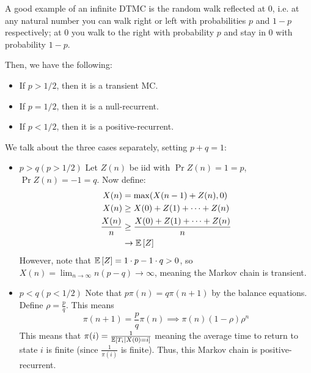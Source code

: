 A good example of an infinite DTMC is the random walk reflected at 0, i.e. at any natural number you can walk right or left with probabilities
$p$ and $1-p$ respectively; at 0 you walk
to the right with probability $p$ and stay in 0 with probability $1 - p$.

Then, we have the following:
\begin{itemize}
    \item If $p > 1/2$, then it is a transient MC.
    \item If $p = 1/2$, then it is a null-recurrent.
    \item If $p < 1/2$, then it is a positive-recurrent.
\end{itemize}

\begin{proof*}
    We talk about the three cases separately, setting $p + q = 1$:
    \begin{itemize}
        \item $p > q (p > 1/2)$
        Let $Z(n)$ be iid with $\Pr{Z(n) = 1} = p$, $\Pr{Z(n) = -1} = q$. Now define:
        \begin{align*} 
            X(n) &= \max(X(n - 1) + Z(n), 0) \\
            X(n) &\geq X(0) + Z(1) + \dots + Z(n) \\
            \frac{X(n)}{n} &\geq \frac{X(0) + Z(1) + \dots + Z(n)}{n} \\
            &\to \mathbb{E}\left[ Z \right]
        \end{align*}
        However, note that $\mathbb{E}\left[ Z \right] = 1 \cdot p - 1 \cdot q > 0 $, so $X(n) = \lim_{n \to \infty} n(p - q) \to \infty$, meaning
        the Markov chain is transient.
    \end{itemize}

    \begin{itemize}
        \item $p < q (p < 1/2)$
        Note that $p \pi(n) = q \pi(n + 1)$ by the balance equations. Define $\rho = \frac{p}{q}$. This means
        \[ \pi(n + 1) = \frac{p}{q} \pi(n) \implies \pi(n)  (1 - \rho)\rho^n \]
        This means that $\pi(i) = \frac{1}{\mathbb{E}\left[ T_i \mid {X(0) = i} \right]}$ meaning the average time to return to state $i$ is
        finite (since $\frac{1}{\pi(i)}$ is finite). Thus, this Markov chain is positive-recurrent.
    \end{itemize}


\end{proof*}
